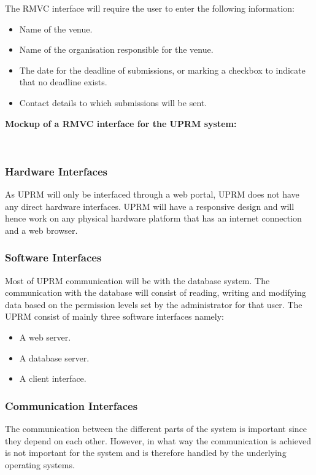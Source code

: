 	The RMVC interface will require the user to enter the following information:
	\begin{itemize}
		\item Name of the venue.
		\item Name of the organisation responsible for the venue.
		\item The date for the deadline of submissions, or marking a checkbox to indicate that no deadline exists.
		\item Contact details to which submissions will be sent.
	\end{itemize}
	
	\textbf{Mockup of a RMVC interface for the UPRM system: }\\
	\centerline{}\\
	
	
\subsubsection{Hardware Interfaces}
	As UPRM will only be interfaced through a web portal, UPRM does not have any direct hardware interfaces. UPRM will have a responsive design and will hence work on any physical hardware platform that has an internet connection and a web browser.
	
\subsubsection{Software Interfaces}
	Most of UPRM communication will be with the database system. The communication with the database will consist of reading, writing and modifying data based on the permission levels set by the administrator for that user. The UPRM consist of mainly three software interfaces namely:
	\begin{itemize}
		\item A web server.
		\item A database server.
		\item A client interface.
	\end{itemize}

\subsubsection{Communication Interfaces}
	The communication between the different parts of the system is important since they depend on each
	other. However, in what way the communication is achieved is not important for the system and is
	therefore handled by the underlying operating systems.
